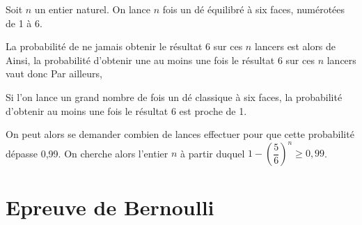 \documentclass[11pt,fleqn, openany]{book} %
\begin{document}
\begin{example}
\begin{minipage}{0.49\linewidth}
\begin{center}
\end{center}
\end{minipage}

\end{example}

\begin{example}Soit $n$ un entier naturel. On lance $n$ fois un dé équilibré à six faces, numérotées de 1 à 6.

La probabilité de ne jamais obtenir le résultat 6 sur ces $n$ lancers est alors de
\vskip10pt
Ainsi, la probabilité d'obtenir une au moins une fois le résultat 6 sur ces $n$ lancers vaut donc
\vskip10pt
Par ailleurs, 

\vskip20pt

Si l'on lance un grand nombre de fois un dé classique à six faces, la probabilité d'obtenir au moins une fois le résultat 6 est proche de 1.

On peut alors se demander combien de lances effectuer pour que cette probabilité dépasse 0,99. On cherche alors l'entier $n$ à partir duquel $1-\left(\dfrac{5}{6}\right)^n \geqslant 0,99$.

\vskip150pt

\end{example}

\newpage 
\section{Epreuve de Bernoulli}
\end{document}
